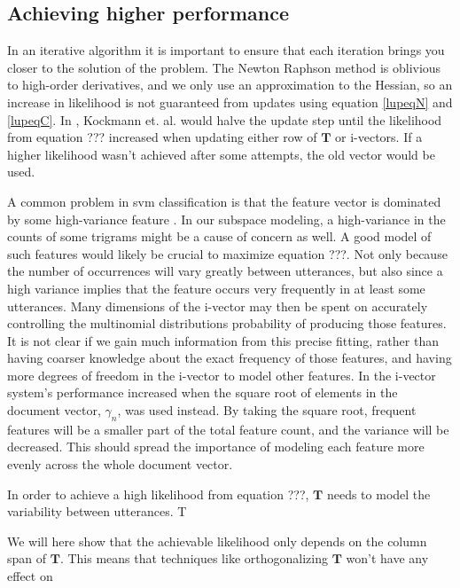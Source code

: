 \subsection{Achieving higher performance}

In an iterative algorithm it is important to ensure that each iteration brings you closer to the solution of the problem. The Newton Raphson method is oblivious to high-order derivatives, and we only use an approximation to the Hessian, so an increase in likelihood is not guaranteed from updates using equation \ref{lupeqN} and \ref{lupeqC}. In \cite{kockmann2010prosodic}, Kockmann et. al. would halve the update step until the likelihood from equation ??? increased when updating either row of $\mathbf{T}$ or i-vectors. If a higher likelihood wasn't achieved after some attempts, the old vector would be used.  

A common problem in svm classification is that the feature vector is dominated by some high-variance feature \cite{wan2005speaker}. In our subspace modeling, a high-variance in the counts of some trigrams might be a cause of concern as well. A good model of such features would likely be crucial to maximize equation ???. Not only because the number of occurrences will vary greatly between utterances, but also since a high variance implies that the feature occurs very frequently in at least some utterances. Many dimensions of the i-vector may then be spent on accurately controlling the multinomial distributions probability of producing those features. It is not clear if we gain much information from this precise fitting, rather than having coarser knowledge about the exact frequency of those features, and having more degrees of freedom in the i-vector to model other features. In \cite{soufifar2011ivector} the i-vector system's performance increased when the square root of elements in the document vector, $\gamma_n$, was used instead. By taking the square root, frequent features will be a smaller part of the total feature count, and the variance will be decreased. This should spread the importance of modeling each feature more evenly across the whole document vector.



In order to achieve a high likelihood from equation ???, $\mathbf{T}$ needs to model the variability between utterances. T

We will here show that the achievable likelihood only depends on the column span of $\mathbf{T}$. This means that techniques like orthogonalizing $\mathbf{T}$ won't have any effect on 